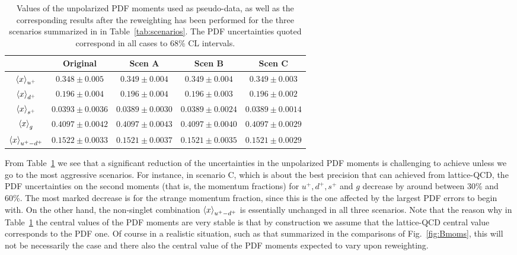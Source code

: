 \begin{table}[t]
  \centering
  \renewcommand{\arraystretch}{1.3} 
\begin{tabular}{c||c|c|c|c}
  \hline &  Original  & Scen A  &  Scen B  &  Scen C  \\
  \hline
  \hline
  $\left\langle x\right\rangle_{u^+}$     &   $0.348 \pm  0.005$    &  $ 0.349 \pm 0.004$     &
  $ 0.349 \pm 0.004$   &  $ 0.349 \pm 0.003$   \\
  $\left\langle x\right\rangle_{d^+}$     &   $0.196\pm  0.004$     & $0.196 \pm0.004$       &
  $0.196 \pm0.003$ &   $0.196 \pm0.002$ \\
  $\left\langle x\right\rangle_{s^+}$     &   $0.0393 \pm 0.0036$   &  $0.0389\pm 0.0030$   &
 $0.0389\pm 0.0024$   &   $0.0389\pm 0.0014$  \\
  $\left\langle x\right\rangle_{g}$       &   $0.4097\pm 0.0042$    &  $0.4097 \pm 0.0043$    &
   $0.4097 \pm 0.0040$  &    $0.4097 \pm 0.0029$  \\
  $\left\langle x\right\rangle_{u^+-d^+}$  &   $0.1522 \pm 0.0033$   &  $0.1521 \pm 0.0037$   &
   $0.1521 \pm 0.0035$ &    $0.1521 \pm 0.0029$ \\
  \hline
\end{tabular}
\caption{\small Values of the unpolarized PDF moments
  used as pseudo-data, as well as the corresponding results
  after the reweighting has been performed for the
three scenarios summarized in 
in Table~\ref{tab:scenarios}.
%
The PDF uncertainties quoted correspond in all cases to 68\%
CL intervals.
\label{tab:unpolmomentsrw}
}
\end{table}

From Table~\ref{tab:unpolmomentsrw} we see that a significant
reduction of the uncertainties in the unpolarized PDF moments is challenging to achieve
unless we go to the most aggressive scenarios.
%
For instance, in scenario C, which is about the best precision that
can achieved from lattice-QCD, the PDF uncertainties on the second moments
(that is, the momentum fractions) for $u^+,d^+,s^+$ and $g$ decrease by around
between 30\% and 60\%.
%
The most marked decrease is for the strange momentum fraction, since this is the
one affected by the largest PDF errors to begin with.
%
On the other hand, the non-singlet combination $\left\langle x\right\rangle_{u^+-d^+}$ is essentially
unchanged in all three scenarios.
%
Note that the reason why in Table~\ref{tab:unpolmomentsrw} the central values
of the PDF moments are very stable is that by construction we assume that the
lattice-QCD central value corresponds to the PDF one.
%
Of course in a realistic situation, such as that summarized in the
comparisons of Fig.~\ref{fig:Bmoms}, this will not be necessarily the case
and there also the central value of the PDF moments expected to vary
upon reweighting.


